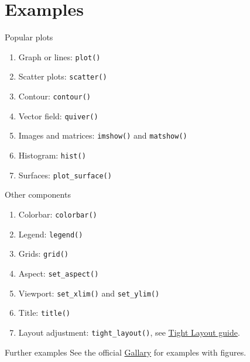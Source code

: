 \documentclass[english, nochinese]{../TeXTemplate/pkuslide}
\begin{document}
\section{Examples}

\begin{frame}
\sectionpage
\end{frame}

\begin{frame}[fragile]{Popular plots}
\begin{enumerate}
\item Graph or lines: \verb"plot()"
\item Scatter plots: \verb"scatter()"
\item Contour: \verb"contour()"
\item Vector field: \verb"quiver()"
\item Images and matrices: \verb"imshow()" and \verb"matshow()"
\item Histogram: \verb"hist()"
\item Surfaces: \verb"plot_surface()"
\end{enumerate}
\end{frame}

\begin{frame}[fragile]{Other components}
\begin{enumerate}
\item Colorbar: \verb"colorbar()"
\item Legend: \verb"legend()"
\item Grids: \verb"grid()"
\item Aspect: \verb"set_aspect()"
\item Viewport: \verb"set_xlim()" and \verb"set_ylim()"
\item Title: \verb"title()"
\item Layout adjustment: \verb"tight_layout()", see \href{https://matplotlib.org/tutorials/intermediate/tight_layout_guide.html}{Tight Layout guide}.
\end{enumerate}
\end{frame}

\begin{frame}{Further examples}
See the official \href{https://matplotlib.org/gallery.html}{Gallary} for examples with figures.
\end{frame}
\end{document}
